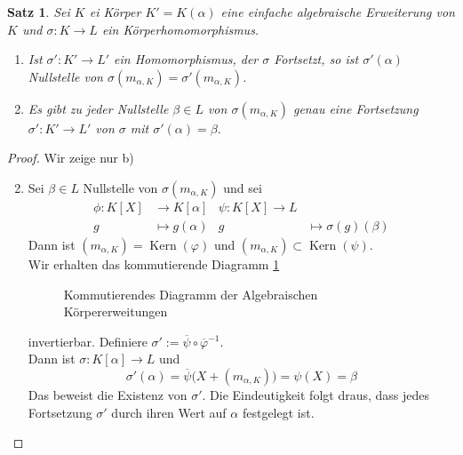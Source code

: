 \documentclass[10pt,a4paper]{article}
\newcommand{\al}{\ensuremath{\alpha}}
\newcommand{\ol}[1]{\overline{#1}}
\newcommand{\Kern}{\operatorname{Kern}}
\theoremstyle{plain}
\newtheorem{satz}[theorem]{Satz}
\theoremstyle{definition}
\theoremstyle{remark}
\begin{document}
 	\begin{satz}\label{satz:nsterhaltung}
 		Sei $K$ ei Körper $K'=K(\al)$ eine einfache algebraische Erweiterung von $K$ und $\sigma:K\to L$ ein Körperhomomorphismus.
 		\begin{enumerate}
 			\item Ist $\sigma':K'\to L'$ ein Homomorphismus, der $\sigma$ Fortsetzt, so ist $\sigma'(\al)$ Nullstelle von $\sigma(m_{\al,K})=\sigma'(m_{\al,K})$.
 			\item Es gibt zu jeder Nullstelle $\beta\in L$ von $\sigma(m_{\al,K})$ genau eine Fortsetzung $\sigma':K'\to L'$ von $\sigma$ mit $\sigma'(\al)=\beta$.
 		\end{enumerate}
 	\end{satz}
 	\begin{proof}
 		Wir zeige nur b)
 		\begin{enumerate}
 			\setcounter{enumi}{1}
 			\item Sei $\beta\in L$ Nullstelle von $\sigma(m_{\al,K})$ und sei
 			\begin{align*}
 			\phi:K[X]&\to K[\al]&\psi:K[X]\to L\\
 			g&\mapsto g(\al)&g&\mapsto \sigma(g)(\beta)
 			\end{align*}
 			Dann ist $(m_{\al,K})=\Kern(\varphi)$ und $(m_{\al,K})\subset\Kern(\psi)$.\\
 			Wir erhalten das kommutierende Diagramm \ref{fig:cdiag-alg-einf-KE}
 			\begin{figure}
 				\centering
 			\caption{Kommutierendes Diagramm der Algebraischen Körpererweitungen}
 			\label{fig:cdiag-alg-einf-KE}
 			\end{figure}
 			invertierbar. Definiere $\sigma':=\ol{\psi}\circ\ol{\varphi}^{-1}$.\\
 			Dann ist $\sigma:K[\al]\to L$ und \[\sigma'(\al)=\ol{\psi}\big(X+(m_{\al,K})\big)=\psi(X)=\beta\]
 			Das beweist die Existenz von $\sigma'$. Die Eindeutigkeit folgt draus, dass jedes Fortsetzung $\sigma'$ durch ihren Wert auf $\al$ festgelegt ist.
 		\end{enumerate}
 	\end{proof}
 
\end{document}
